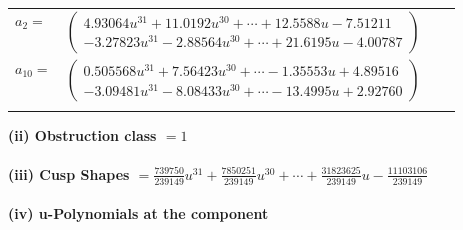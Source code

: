 \documentclass[1p]{elsarticle_modified}
\theoremstyle{definition}
\begin{document}
\begin{tabular}{m{7pt} m{180pt} m{7pt} m{180pt} }
\flushright $a_{2}=$&$\begin{pmatrix}4.93064 u^{31}+11.0192 u^{30}+\cdots+12.5588 u-7.51211\\-3.27823 u^{31}-2.88564 u^{30}+\cdots+21.6195 u-4.00787\end{pmatrix}$ \\
\flushright $a_{10}=$&$\begin{pmatrix}0.505568 u^{31}+7.56423 u^{30}+\cdots-1.35553 u+4.89516\\-3.09481 u^{31}-8.08433 u^{30}+\cdots-13.4995 u+2.92760\end{pmatrix}$\\&\end{tabular}
\flushleft \textbf{(ii) Obstruction class $= 1$}\\~\\
\flushleft \textbf{(iii) Cusp Shapes $= \frac{739750}{239149} u^{31}+\frac{7850251}{239149} u^{30}+\cdots+\frac{31823625}{239149} u-\frac{11103106}{239149}$}\\~\\
\newpage\renewcommand{\arraystretch}{1}
\flushleft \textbf{(iv) u-Polynomials at the component}\newline \\
\end{document}
